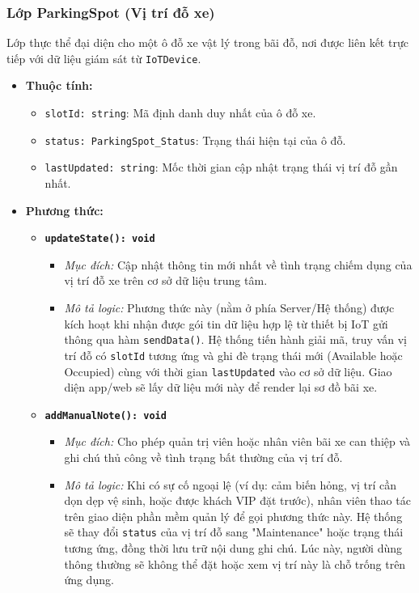\subsubsection{Lớp ParkingSpot (Vị trí đỗ xe)}
Lớp thực thể đại diện cho một ô đỗ xe vật lý trong bãi đỗ, nơi được liên kết trực tiếp với dữ liệu giám sát từ \texttt{IoTDevice}.

\begin{itemize}
    \item \textbf{Thuộc tính:}
    \begin{itemize}
        \item \texttt{slotId: string}: Mã định danh duy nhất của ô đỗ xe.
        \item \texttt{status: ParkingSpot\_Status}: Trạng thái hiện tại của ô đỗ.
        \item \texttt{lastUpdated: string}: Mốc thời gian cập nhật trạng thái vị trí đỗ gần nhất.
    \end{itemize}
    
    \item \textbf{Phương thức:}
    \begin{itemize}
        \item \textbf{\texttt{updateState(): void}}
        \begin{itemize}
            \item \textit{Mục đích:} Cập nhật thông tin mới nhất về tình trạng chiếm dụng của vị trí đỗ xe trên cơ sở dữ liệu trung tâm.
            \item \textit{Mô tả logic:} Phương thức này (nằm ở phía Server/Hệ thống) được kích hoạt khi nhận được gói tin dữ liệu hợp lệ từ thiết bị IoT gửi thông qua hàm \texttt{sendData()}. Hệ thống tiến hành giải mã, truy vấn vị trí đỗ có \texttt{slotId} tương ứng và ghi đè trạng thái mới (Available hoặc Occupied) cùng với thời gian \texttt{lastUpdated} vào cơ sở dữ liệu. Giao diện app/web sẽ lấy dữ liệu mới này để render lại sơ đồ bãi xe.
        \end{itemize}

        \item \textbf{\texttt{addManualNote(): void}}
        \begin{itemize}
            \item \textit{Mục đích:} Cho phép quản trị viên hoặc nhân viên bãi xe can thiệp và ghi chú thủ công về tình trạng bất thường của vị trí đỗ.
            \item \textit{Mô tả logic:} Khi có sự cố ngoại lệ (ví dụ: cảm biến hỏng, vị trí cần dọn dẹp vệ sinh, hoặc được khách VIP đặt trước), nhân viên thao tác trên giao diện phần mềm quản lý để gọi phương thức này. Hệ thống sẽ thay đổi \texttt{status} của vị trí đỗ sang "Maintenance" hoặc trạng thái tương ứng, đồng thời lưu trữ nội dung ghi chú. Lúc này, người dùng thông thường sẽ không thể đặt hoặc xem vị trí này là chỗ trống trên ứng dụng.
        \end{itemize}
    \end{itemize}
\end{itemize}

